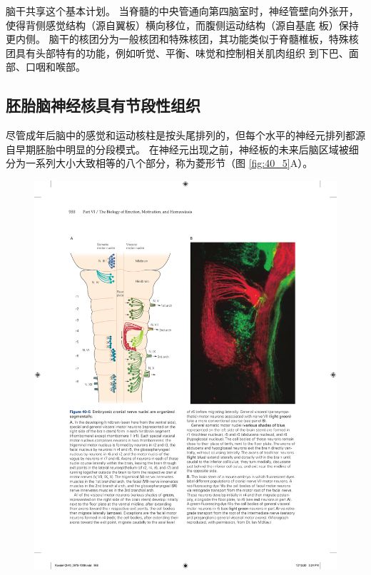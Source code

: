 脑干共享这个基本计划。 当脊髓的中央管通向第四脑室时，神经管壁向外张开，使得背侧感觉结构（源自翼板）横向移位，而腹侧运动结构（源自基底 板）保持更内侧。 脑干的核团分为一般核团和特殊核团，其功能类似于脊髓椎板，特殊核团具有头部特有的功能，例如听觉、平衡、味觉和控制相关肌肉组织 到下巴、面部、口咽和喉部。



\subsection{胚胎脑神经核具有节段性组织}
尽管成年后脑中的感觉和运动核柱是按头尾排列的，但每个水平的神经元排列都源自早期胚胎中明显的分段模式。 
在神经元出现之前，神经板的未来后脑区域被细分为一系列大小大致相等的八个部分，称为菱形节（图 \ref{fig:40_5}A）。

\begin{figure}[htbp]
	\centering
	\includegraphics[width=0.9\linewidth]{chap40/fig_40_5}

\end{figure}
